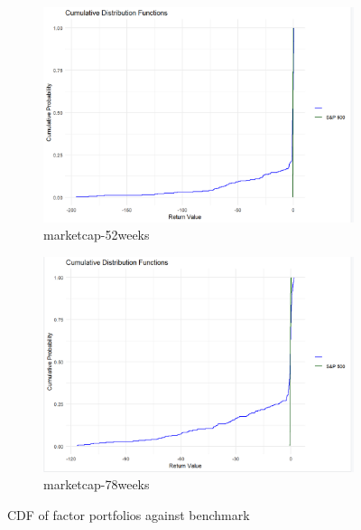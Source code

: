 \documentclass{article}
\begin{document}
\begin{figure}[H]
    \begin{subfigure}{0.45\textwidth}
        \centering
        \includegraphics[width=\textwidth]{31.png}
        \caption{marketcap-52weeks}
        \label{fig:image31}
    \end{subfigure}
    \hspace{0.05\textwidth}
    \begin{subfigure}{0.45\textwidth}
        \centering
        \includegraphics[width=\textwidth]{32.png}
        \caption{marketcap-78weeks}
        \label{fig:image32}
    \end{subfigure}

    \caption{CDF of factor portfolios against benchmark}
    \label{fig:multiimages}
\end{figure}
\end{document}
